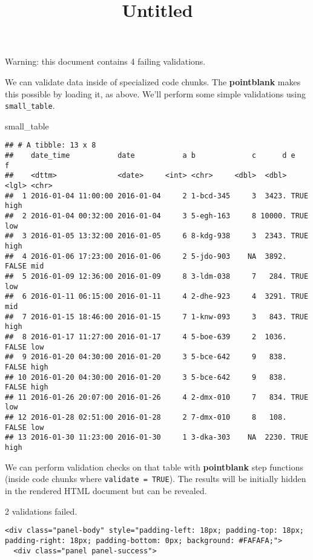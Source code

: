 \documentclass[
]{article}
\title{Untitled}
\author{}
\date{\vspace{-2.5em}}
\newenvironment{Shaded}{\begin{snugshade}}{\end{snugshade}}
\newcommand{\NormalTok}[1]{#1}
\begin{document}
\maketitle

Warning: this document contains 4 failing validations.

We can validate data inside of specialized code chunks. The
\textbf{pointblank} makes this possible by loading it, as above. We'll
perform some simple validations using \texttt{small\_table}.

\begin{Shaded}
\begin{Highlighting}[]
\NormalTok{small\_table}
\end{Highlighting}
\end{Shaded}

\begin{verbatim}
## # A tibble: 13 x 8
##    date_time           date           a b             c      d e     f    
##    <dttm>              <date>     <int> <chr>     <dbl>  <dbl> <lgl> <chr>
##  1 2016-01-04 11:00:00 2016-01-04     2 1-bcd-345     3  3423. TRUE  high 
##  2 2016-01-04 00:32:00 2016-01-04     3 5-egh-163     8 10000. TRUE  low  
##  3 2016-01-05 13:32:00 2016-01-05     6 8-kdg-938     3  2343. TRUE  high 
##  4 2016-01-06 17:23:00 2016-01-06     2 5-jdo-903    NA  3892. FALSE mid  
##  5 2016-01-09 12:36:00 2016-01-09     8 3-ldm-038     7   284. TRUE  low  
##  6 2016-01-11 06:15:00 2016-01-11     4 2-dhe-923     4  3291. TRUE  mid  
##  7 2016-01-15 18:46:00 2016-01-15     7 1-knw-093     3   843. TRUE  high 
##  8 2016-01-17 11:27:00 2016-01-17     4 5-boe-639     2  1036. FALSE low  
##  9 2016-01-20 04:30:00 2016-01-20     3 5-bce-642     9   838. FALSE high 
## 10 2016-01-20 04:30:00 2016-01-20     3 5-bce-642     9   838. FALSE high 
## 11 2016-01-26 20:07:00 2016-01-26     4 2-dmx-010     7   834. TRUE  low  
## 12 2016-01-28 02:51:00 2016-01-28     2 7-dmx-010     8   108. FALSE low  
## 13 2016-01-30 11:23:00 2016-01-30     1 3-dka-303    NA  2230. TRUE  high
\end{verbatim}

We can perform validation checks on that table with \textbf{pointblank}
step functions (inside code chunks where \texttt{validate\ =\ TRUE}).
The results will be initially hidden in the rendered HTML document but
can be revealed.

{2 validations failed.}

\hypertarget{chunk-3849277}{}
\begin{verbatim}
<div class="panel-body" style="padding-left: 18px; padding-top: 18px; padding-right: 18px; padding-bottom: 0px; background: #FAFAFA;">
  <div class="panel panel-success">
\end{verbatim}
\end{document}
